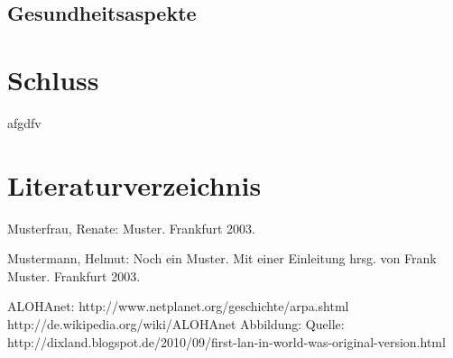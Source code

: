 \documentclass[a4paper,13pt]{scrartcl}
\begin{document}
\subsection{Gesundheitsaspekte}


\section{Schluss}
afgdfv

\clearpage

\section{Literaturverzeichnis}

Musterfrau, Renate: Muster. Frankfurt 2003.


Mustermann, Helmut: Noch ein Muster. Mit einer Einleitung hrsg. von Frank Muster. Frankfurt 2003.

ALOHAnet: http://www.netplanet.org/geschichte/arpa.shtml
http://de.wikipedia.org/wiki/ALOHAnet
Abbildung: Quelle: http://dixland.blogspot.de/2010/09/first-lan-in-world-was-original-version.html
\end{document}
